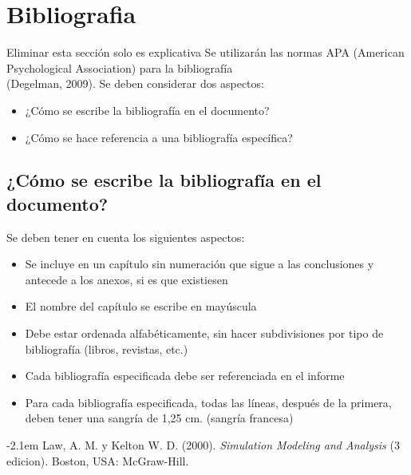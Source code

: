 \documentclass[oneside,12pt, letterpaper, titlepage]{book}
\begin{document}
\chapter{Bibliografia} %
Eliminar esta sección solo es explicativa
Se utilizarán las normas APA (American Psychological Association) para la bibliografía\\  

(Degelman, 2009). Se deben considerar dos aspectos: 
\begin{itemize}
    \item ¿Cómo se escribe la bibliografía en el documento?
    \item ¿Cómo se hace referencia a una bibliografía específica?
\end{itemize}

\section{¿Cómo se escribe la bibliografía en el documento?}
Se deben tener en cuenta los siguientes aspectos: 
\begin{itemize}
    \item Se incluye en un capítulo sin numeración que sigue a las conclusiones y antecede a los anexos, si es que existiesen
    \item El nombre del capítulo se escribe en mayúscula 
    \item Debe estar ordenada alfabéticamente, sin hacer subdivisiones por tipo de bibliografía (libros, revistas, etc.) 
    \item Cada bibliografía especificada debe ser referenciada en el informe 
    \item Para cada bibliografía especificada, todas las líneas, después de la primera, deben tener una sangría de 1,25 cm. (sangría francesa)
\end{itemize}


\renewcommand\bibname{BIBLIOGRAFÍA}


\def\bibindent{1cm}
\begin{thebibliography}{99\kern\bibindent}%
\makeatletter
\let\old@biblabel\@biblabel
\def\@biblabel#1{{}\kern\bibindent} %
\let\old@bibitem\bibitem
\def\bibitem#1{\old@bibitem{#1}\leavevmode\kern-\bibindent\kern-2.1em}
\makeatother
    

     Law, A. M. y Kelton W. D. (2000). \textit{Simulation Modeling and Analysis} (3 edicion). Boston, USA: McGraw-Hill.

\end{thebibliography}
\end{document}
